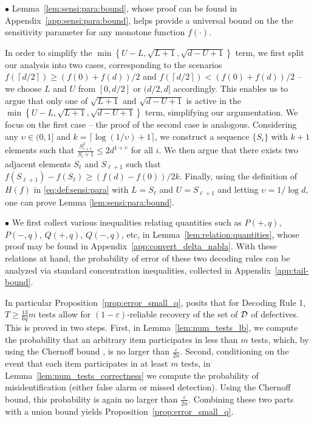 \documentclass[onecolumn,letterpaper]{IEEEtran}
\newcommand{\cD}{{\cal D}}
\newcommand{\cp}{{q}}
\newcommand{\nt}{{m}}
\newcommand{\pn}{{P(-,\cp)}}
\newcommand{\pp}{{P(+,\cp)}}
\newcommand{\up}{{U}}
\newcommand{\lw}{{L}}
\newcommand{\pnm}{{Q(-,\cp)}}
\newcommand{\ppm}{{Q(+,\cp)}}
\newcommand{\fH}{{H(f)}}
\newcommand{\seq}{{S}}
\newcommand{\ups}{{\upsilon}}
\newcommand{\logu}{{k}}
\newcommand{\ind}{{i}}
\newcommand{\exiind}{{\ell}}
\begin{document}
$\bullet$ \noindent {\it Lemma \ref{lem:sensi:para:bound} -- $\fH$:} Lemma~\ref{lem:sensi:para:bound}, whose proof can be found in Appendix~\ref{app:sensi:para:bound}, helps provide a universal bound on the the sensitivity parameter for any monotone function $f(\cdot)$.

In order to simplify the $\min\left\{\up-\lw , \sqrt{\lw+1} , \sqrt{d-\up+1}\right\}$ term, we first split our analysis into two cases, corresponding to the scenarios $f\left(\left\lceil d/2\right \rceil\right)\geq (f(0)+f(d))/2$ and $f\left(\left\lceil d/2\right \rceil\right) < (f(0)+f(d))/2$ -- we choose $\lw$ and $\up$ from $[0,d/2]$ or $(d/2,d]$ accordingly. This enables us to argue that only one of $\sqrt{\lw+1}$ and $\sqrt{d-\up+1}$ is active in the $\min\left\{\up-\lw , \sqrt{\lw+1} , \sqrt{d-\up+1}\right\}$ term, simplifying our argumentation. We focus on the first case -- the proof of the second case is analogous. Considering any $\ups \in (0,1]$ and $\logu = \lceil \log (1/\ups) + 1 \rceil$, we construct a sequence  $\{\seq_{\ind}\}$ with $\logu+1$ elements such that $\frac{\seq_{\ind+1}^2} {  \seq_\ind+1  } \le 2d^{1+\ups}$ for all $\ind$. We then argue that there exists two adjacent elements $\seq_\exiind$ and $\seq_{\exiind+1}$ such that $f(\seq_{\exiind+1}) - f(\seq_{\exiind}) \ge (f(d)-f(0)) / 2\logu$. Finally, using the definition of $\fH$ in \eqref{eq:def:sensi:para} with $\lw=\seq_{\exiind}$ and $\up=\seq_{\exiind+1}$ and letting $\ups = 1/\log d$, one can prove Lemma \ref{lem:sensi:para:bound}.


$\bullet$ 
We first collect various inequalities relating quantities such as $\pp$, $\pn$, $\ppm$, $\pnm$, etc, in Lemma~\ref{lem:relation:quantities}, whose proof may be found in Appendix~\ref{app:convert_delta_nabla}. With these relations at hand, the probability of error of these two decoding rules can be analyzed via standard concentration inequalities, collected in Appendix~\ref{app:tail-bound}. 

In particular Proposition~\ref{prop:error_small_q}, posits that for Decoding Rule 1, $T \geq \frac{13}{6\cp}\nt$ tests allow for $(1-\varepsilon)$-reliable recovery of the set of $\cD$ of defectives. This is proved in two steps. 
First, in Lemma~\ref{lem:num_tests_lb}, we compute the probability that an arbitrary item participates in less than $\nt$ tests, which, by using the Chernoff bound \cite{chernoff}, is no larger than $\frac{\varepsilon}{2n}$. Second, conditioning on the event that each item participates in at least $\nt$ tests, in Lemma~\ref{lem:num_tests_correctness} we compute the probability of misidentification (either false alarm or missed detection). Using the Chernoff bound, this probability is again no larger than $\frac{\varepsilon}{2n}$. Combining these two parts with a union bound yields Proposition~\ref{prop:error_small_q}. 
\end{document}
